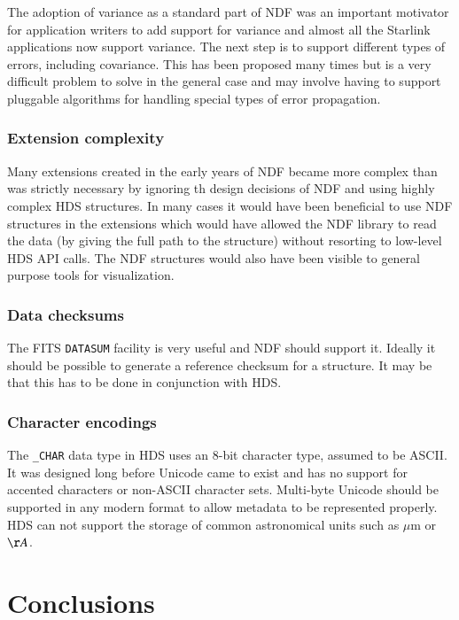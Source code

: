 \documentclass[final,authoryear,5p,times,twocolumn]{elsarticle}
\begin{document}
{The adoption of variance as a standard part of NDF was an important
motivator for application writers to add support for variance and
almost all the Starlink applications now support variance. The next
step is to support different types of errors, including
covariance. This has been proposed many times \citep[see
e.g.][]{1991STARB...8...19M} but is a very difficult problem to solve
in the general case and may involve having to support pluggable
algorithms for handling special types of error propagation.

\subsubsection{Extension complexity}

Many extensions created in the early years of NDF became more complex
than was strictly necessary by ignoring th design decisions of NDF and
using highly complex HDS structures. In many cases it would have been
beneficial to use NDF structures in the extensions which would have
allowed the NDF library to read the data (by giving the full path to
the structure) without resorting to low-level HDS API calls. The NDF
structures would also have been visible to general purpose tools for
visualization.

\subsubsection{Data checksums}

The FITS \texttt{DATASUM} facility is very useful and NDF should support
it. Ideally it should be possible to generate a reference checksum for
a structure. It may be that this has to be done in conjunction with
HDS.

\subsubsection{Character encodings}

The \texttt{\_CHAR} data type in HDS uses an 8-bit character type,
assumed to be ASCII. It was designed long before Unicode came to exist
and has no support for accented characters or non-ASCII character
sets. Multi-byte Unicode should be supported in any modern format to
allow metadata to be represented properly. HDS can not support the
storage of common astronomical units such as $\mu$m or $\AA$.


\section{Conclusions}

}
\end{document}

